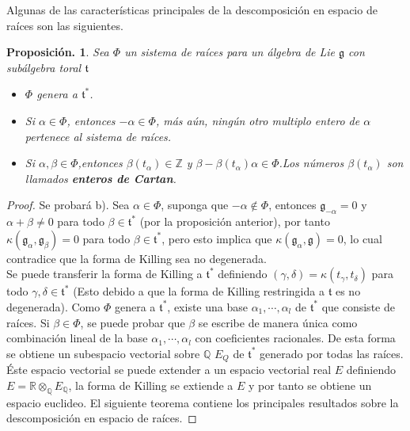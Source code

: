 \documentclass[11pt,a4paper]{article}
\newtheorem{proposition}{Proposici\'on.}
\begin{document}
Algunas de las características  principales de la descomposición en espacio de raíces son las siguientes.
\begin{proposition}\label{prop: sistema de raices de alg de lie ss}
Sea $\Phi$ un sistema de raíces para un álgebra de Lie $\mathfrak{g}$ con subálgebra toral $\mathfrak{t}$
\begin{itemize}
    \item[a)] $\Phi$ genera a $\mathfrak{t}^*$.
    \item[b)] Si $\alpha\in \Phi$, entonces $-\alpha \in \Phi$, más aún, ningún otro multiplo entero de $\alpha$ pertenece al sistema de raíces.
    \item[c)] Si $\alpha, \beta \in \Phi$,entonces $\beta(t_{\alpha}) \in \mathbb{Z}$ y $\beta- \beta(t_{\alpha})\alpha \in \Phi$.Los números $\beta(t_{\alpha})$  son llamados \textbf{enteros de Cartan}.
\end{itemize}
\end{proposition}
\begin{proof}
Se probará b).  Sea $\alpha \in \Phi$, suponga que $-\alpha \not\in \Phi$, entonces $\mathfrak{g}_{-\alpha}=0  $  y $\alpha + \beta \neq 0$ para todo $\beta \in \mathfrak{t}^*$ (por la proposición anterior), por tanto $\kappa (\mathfrak{g}_{\alpha}, \mathfrak{g}_{\beta})=0$ para todo $\beta \in \mathfrak{t}^*$, pero esto implica que $\kappa (\mathfrak{g}_{\alpha}, \mathfrak{g})=0$, lo cual contradice que la forma de Killing sea no degenerada. \\

Se puede transferir la forma de Killing a $\mathfrak{t}^*$ definiendo $(\gamma, \delta)= \kappa(t_{\gamma}, t_{\delta})$ para todo $\gamma, \delta \in \mathfrak{t}^*$ (Esto debido a que la forma de Killing restringida a $\mathfrak{t}$ es no degenerada). Como $\Phi$ genera a $\mathfrak{t}^*$, existe una base $\alpha_1, \cdots, \alpha_l$ de $\mathfrak{t}^*$ que consiste de raíces. Si $\beta\in \Phi$, se puede probar que $\beta$ se escribe de manera única como combinación lineal de la base $\alpha_1, \cdots, \alpha_l$ con coeficientes racionales. De esta forma se obtiene un subespacio vectorial sobre $\mathbb{Q}$ $E_{Q}$ de $\mathfrak{t}^*$ generado por todas las raíces. Éste espacio vectorial se puede extender a un espacio vectorial real $E$ definiendo $E=\mathbb{R} \otimes_{\mathbb{Q}} E_{\mathbb{Q}}$, la forma de Killing se extiende a $E$ y por tanto se obtiene un espacio euclideo. El siguiente teorema contiene los principales resultados sobre la descomposición  en espacio de raíces.
\end{proof}
\end{document}
